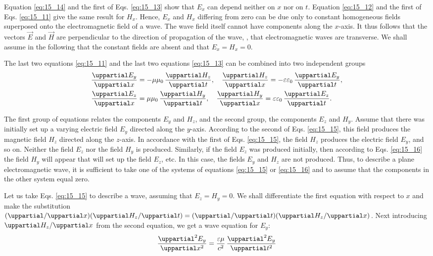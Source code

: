 \noindent
Equation \eqref{eq:15_14} and the first of Eqs. \eqref{eq:15_13} show that $E_x$ can depend neither on $x$ nor on $t$.
Equation \eqref{eq:15_12} and the first of Eqs.
\eqref{eq:15_11} give the same result for $H_x$.
Hence, $E_x$ and $H_x$ differing from zero can be due only to constant homogeneous fields superposed onto the electromagnetic field of a wave.
The wave field itself cannot have components along the $x$-axis.
It thus follows that the vectors $\vec{E}$ and $\vec{H}$ are perpendicular to the direction of propagation of the wave, \ie, that electromagnetic waves are transverse.
We shall assume in the following that the constant fields are absent and that $E_x=H_x=0$.

The last two equations \eqref{eq:15_11} and the last two equations \eqref{eq:15_13} can be combined into two independent groups
\begin{align}
    \diffpartial{E_y}{x} &= -\mu\mu_0\, \diffpartial{H_z}{t},\quad \diffpartial{H_z}{x} = -\varepsilon\varepsilon_0\, \diffpartial{E_y}{t}, \label{eq:15_15} \\
    \diffpartial{E_z}{x} &= \mu\mu_0\, \diffpartial{H_y}{t},\quad \diffpartial{H_y}{x} = \varepsilon\varepsilon_0\, \diffpartial{E_z}{t}. \label{eq:15_16}
\end{align}

\noindent
The first group of equations relates the components $E_y$ and $H_z$, and the second group, the components $E_z$ and $H_y$.
Assume that there was initially set up a varying electric field $E_y$ directed along the $y$-axis.
According to the second of Eqs. \eqref{eq:15_15}, this field produces the magnetic field $H_z$ directed along the $z$-axis.
In accordance with the first of Eqs. \eqref{eq:15_15}, the field $H_z$ produces the electric field $E_y$, and so on.
Neither the field $E_z$ nor the field $H_y$ is produced.
Similarly, if the field $E_z$ was produced initially, then according to Eqs. \eqref{eq:15_16} the field $H_y$ will appear that will set up the field $E_z$, etc.
In this case, the fields $E_y$ and $H_z$ are not produced.
Thus, to describe a plane electromagnetic wave, it is sufficient to take one of the systems of equations \eqref{eq:15_15} or \eqref{eq:15_16} and to assume that the components in the other system equal zero.

Let us take Eqs. \eqref{eq:15_15} to describe a wave, assuming that $E_z=H_y=0$.
We shall differentiate the first equation with respect to $x$ and make the substitution $(\diffpartialin{}{x}) (\diffpartialin{H_z}{t}) = (\diffpartialin{}{t}) (\diffpartialin{H_z}{x})$.
Next introducing $\diffpartialin{H_z}{x}$ from the second equation, we get a wave equation for $E_y$:
\begin{equation}\label{eq:15_17}
    \diffnpartial{E_y}{x}{2} = \frac{\varepsilon\mu}{c^2}\, \diffnpartial{E_y}{t}{2}
\end{equation}

